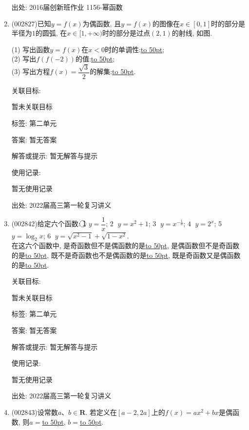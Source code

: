 \documentclass[10pt,a4paper]{article}
\newcommand{\blank}[1]{\underline{\hbox to #1pt{}}}
\begin{document}
\begin{enumerate}[1.]
出处: 2016届创新班作业	1156-幂函数
\item { (002827)}已知$y=f(x)$为偶函数, 且$y=f(x)$的图像在$x\in [0,1]$时的部分是半径为$1$的圆弧, 在$x\in [1,+\infty)$时的部分是过点$(2,1)$的射线, 如图.\\
\begin{center}
\end{center}
(1) 写出函数$y=f(x)$在$x<0$时的单调性:\blank{50};\\
(2) 写出$f(f(-2))$的值:\blank{50};\\
(3) 写出方程$f(x)=\dfrac{\sqrt 3}2$的解集:\blank{50}.


关联目标:

暂未关联目标



标签: 第二单元

答案: 暂无答案

解答或提示: 暂无解答与提示

使用记录:

暂无使用记录


出处: 2022届高三第一轮复习讲义
\item { (002842)}给定六个函数: \textcircled{1} $y=\dfrac 1x$; \textcircled{2} $y=x^2+1$; \textcircled{3} $y={x^{-\frac 13}}$; \textcircled{4} $y=2^x$; \textcircled{5} $y=\log_2x$; \textcircled{6} $y=\sqrt{x^2-1}+\sqrt{1-x^2}$.\\
在这六个函数中, 是奇函数但不是偶函数的是\blank{50}, 是偶函数但不是奇函数的是\blank{50}, 既不是奇函数也不是偶函数的是\blank{50}, 既是奇函数又是偶函数的是\blank{50}.


关联目标:

暂未关联目标



标签: 第二单元

答案: 暂无答案

解答或提示: 暂无解答与提示

使用记录:

暂无使用记录


出处: 2022届高三第一轮复习讲义
\item { (002843)}设常数$a$、$b\in \mathbf{R}$. 若定义在$[a-2,2a]$上的$f(x)=ax^2+bx$是偶函数, 则$a=$\blank{50}, $b=$\blank{50}.



\end{enumerate}
\end{document}
